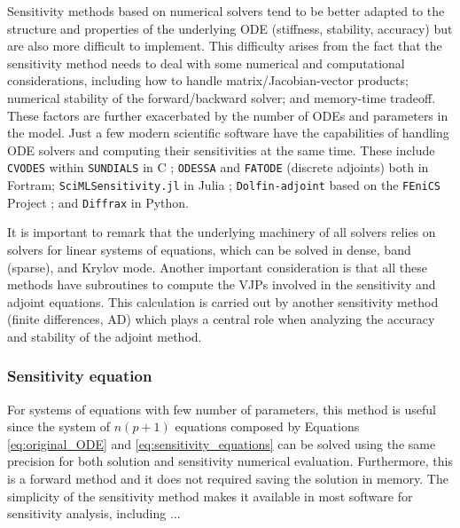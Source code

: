 
Sensitivity methods based on numerical solvers tend to be better adapted to the structure and properties of the underlying ODE (stiffness, stability, accuracy) but are also more difficult to implement.  
This difficulty arises from the fact that the sensitivity method needs to deal with some numerical and computational considerations, including how to handle matrix/Jacobian-vector products; numerical stability of the forward/backward solver; and memory-time tradeoff. 
These factors are further exacerbated by the number of ODEs and parameters in the model. 
Just a few modern scientific software have the capabilities of handling ODE solvers and computing their sensitivities at the same time. 
These include \texttt{CVODES} within \texttt{SUNDIALS} in C \cite{serban2005cvodes, SUNDIALS-hindmarsh2005sundials}; \texttt{ODESSA} \cite{ODESSA} and \texttt{FATODE} (discrete adjoints) \cite{FATODE2014} both in Fortram; \texttt{SciMLSensitivity.jl} in Julia \cite{rackauckas2020universal}; \texttt{Dolfin-adjoint} based on the \texttt{FEniCS} Project \cite{dolfin2013, dolfin2018}; and \texttt{Diffrax} \cite{kidger2021on} in Python. 

It is important to remark that the underlying machinery of all solvers relies on solvers for linear systems of equations, which can be solved in dense, band (sparse), and Krylov mode. 
Another important consideration is that all these methods have subroutines to compute the VJPs involved in the sensitivity and adjoint equations. 
This calculation is carried out by another sensitivity method (finite differences, AD) which plays a central role when analyzing the accuracy and stability of the adjoint method. 

\subsubsection{Sensitivity equation}
\label{section:computing-sensitivity-equations}

For systems of equations with few number of parameters, this method is useful since the system of $n(p+1)$ equations composed by Equations \eqref{eq:original_ODE} and \eqref{eq:sensitivity_equations} can be solved using the same precision for both solution and sensitivity numerical evaluation. 
Furthermore, this is a forward method and it does not required saving the solution in memory. 
The simplicity of the sensitivity method makes it available in most software for sensitivity analysis, including ... 

